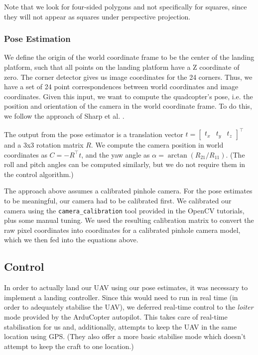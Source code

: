 \documentclass[10pt]{scrartcl} %
\begin{document}
Note that we look for four-sided polygons and not specifically for squares, since they
will not appear as squares under perspective projection.

\subsubsection{Pose Estimation}

We define the origin of the world coordinate frame to be the center of the
landing platform, such that all points on the landing platform have a Z
coordinate of zero. The corner detector gives us image coordinates for the 24
corners. Thus, we have a set of 24 point correspondences between world
coordinates and image coordinates. Given this input, we want to compute the
quadcopter's pose, i.e. the position and orientation of the camera in the world
coordinate frame. To do this, we follow the approach of Sharp et al.
\cite{sharp_et_al_2001}.


The output from the pose estimator is a translation vector
$t = \begin{bmatrix} t_x & t_y & t_z \end{bmatrix}^\top$
and a 3x3 rotation matrix $R$. We compute the camera position in world
coordinates as $C = -R^\top t$, and the yaw angle as
$\alpha = \arctan(R_{21} / R_{11})$. (The roll and pitch angles can be computed
similarly, but we do not require them in the control algorithm.)

The approach above assumes a calibrated pinhole camera. For the pose estimates
to be meaningful, our camera had to be calibrated first. We calibrated our
camera using the {\tt camera\_calibration} tool provided in the OpenCV
tutorials, plus some manual tuning. We used the resulting calibration matrix to
convert the raw pixel coordinates into coordinates for a calibrated pinhole
camera model, which we then fed into the equations above.


\subsection{Control}

In order to actually land our UAV using our pose estimates, it was necessary to
implement a landing controller. Since this would need to run in real time (in
order to adequately stabilise the UAV), we deferred real-time control to the
\textit{loiter} mode provided by the ArduCopter autopilot. This takes care of
real-time stabilisation for us and, additionally, attempts to keep the UAV in
the same location using GPS. (They also offer a more basic stabilise mode which
doesn't attempt to keep the craft to one location.)
\end{document}
